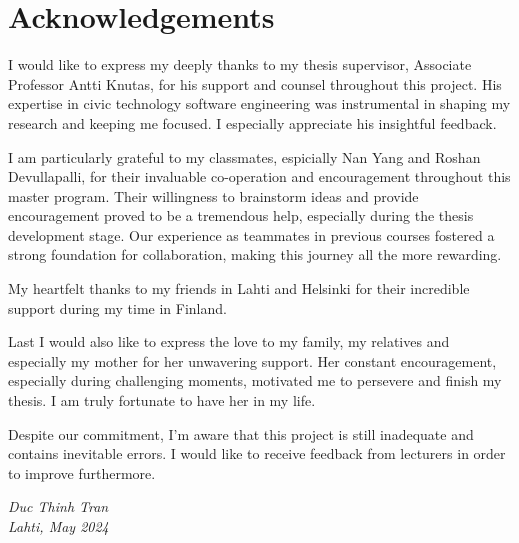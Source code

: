 \section*{Acknowledgements}

I would like to express my deeply thanks to my thesis supervisor, Associate Professor Antti Knutas, for his support and counsel throughout this project. His expertise in civic technology software engineering was instrumental in shaping my research and keeping me focused. I especially appreciate his insightful feedback.

I am particularly grateful to my classmates, espicially Nan Yang and Roshan Devullapalli, for their invaluable co-operation and encouragement throughout this master program. Their willingness to brainstorm ideas and provide encouragement proved to be a tremendous help, especially during the thesis development stage. Our experience as teammates in previous courses fostered a strong foundation for collaboration, making this journey all the more rewarding.

My heartfelt thanks to my friends in Lahti and Helsinki for their incredible support during my time in Finland.

Last I would also like to express the love to my family, my relatives and especially my mother for her unwavering support. Her constant encouragement, especially during challenging moments, motivated me to persevere and finish my thesis. I am truly fortunate to have her in my life.

Despite our commitment, I'm aware that this project is still inadequate and contains inevitable errors. I would like to receive feedback from lecturers in order to improve furthermore.

\textit{Duc Thinh Tran} \\
\textit{Lahti, May 2024}



\clearpage %

